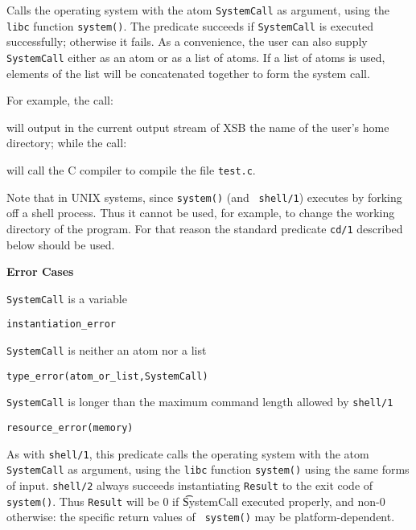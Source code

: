 \begin{description}

%
Calls the operating system with the atom {\tt SystemCall} as argument,
using the {\tt libc} function {\tt system()}.  The predicate succeeds
if {\tt SystemCall} is executed successfully; otherwise it fails.  As
a convenience, the user can also supply {\tt SystemCall} either as an
atom or as a list of atoms.  If a list of atoms is used, elements of
the list will be concatenated together to form the system call.

    For example, the call:


    \noindent
    will output in the current output stream of XSB the name of the
    user's home directory; while the call:


    \noindent
    will call the C compiler to compile the file {\tt test.c}.

    Note that in UNIX systems, since {\tt system()} (and {\tt
      shell/1}) executes by forking off a shell process.  Thus it
    cannot be used, for example, to change the working directory of
    the program.  For that reason the standard predicate {\tt cd/1}
    described below should be used.

{\bf Error Cases}
\bi
\item  {\tt SystemCall} is a variable
\bi
\item {\tt instantiation\_error}
\ei
\item {\tt SystemCall} is neither an atom nor a list
\bi
\item {\tt type\_error(atom\_or\_list,SystemCall)}
\ei
\item {\tt SystemCall} is longer than the maximum command length
  allowed by {\tt shell/1}
\bi
\item {\tt resource\_error(memory)}
\ei
\ei

%
As with {\tt shell/1}, this predicate calls the operating system with
the atom {\tt SystemCall} as argument, using the {\tt libc} function
{\tt system()} using the same forms of input.  {\tt shell/2} always
succeeds instantiating {\tt Result} to the exit code of {\tt
  system()}.  Thus {\tt Result} will be 0 if {\t SystemCall} executed
properly, and non-0 otherwise: the specific return values of {\tt
  system()} may be platform-dependent.


\end{description}
